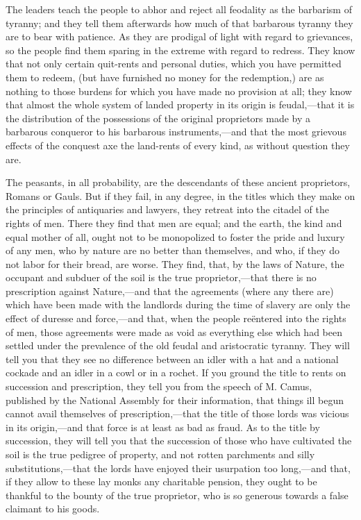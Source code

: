 The leaders teach the people to abhor and reject all feodality as the barbarism of tyranny; and they tell them afterwards how much of that barbarous tyranny they are to bear with patience. As they are prodigal of light with regard to grievances, so the people find them sparing in the extreme with regard to redress. They know that not only certain quit-rents and personal duties, which you have permitted them to redeem, (but have furnished no money for the redemption,) are as nothing to those burdens for which you have made no provision at all; they know that almost the whole system of landed property in its origin is feudal,—that it is the distribution of the possessions of the original proprietors made by a barbarous conqueror to his barbarous instruments,—and that the most grievous effects of the conquest axe the land-rents of every kind, as without question they are.

The peasants, in all probability, are the descendants of these ancient proprietors, Romans or Gauls. But if they fail, in any degree, in the titles which they make on the principles of antiquaries and lawyers, they retreat into the citadel of the rights of men. There they find that men are equal; and the earth, the kind and equal mother of all, ought not to be monopolized to foster the pride and luxury of any men, who by nature are no better than themselves, and who, if they do not labor for their bread, are worse. They find, that, by the laws of Nature, the occupant and subduer of the soil is the true proprietor,—that there is no prescription against Nature,—and that the agreements (where any there are) which have been made with the landlords during the time of slavery are only the effect of duresse and force,—and that, when the people reëntered into the rights of men, those agreements were made as void as everything else which had been settled under the prevalence of the old feudal and aristocratic tyranny. They will tell you that they see no difference between an idler with a hat and a national cockade and an idler in a cowl or in a rochet. If you ground the title to rents on succession and prescription, they tell you from the speech of M. Camus, published by the National Assembly for their information, that things ill begun cannot avail themselves of prescription,—that the title of those lords was vicious in its origin,—and that force is at least as bad as fraud. As to the title by succession, they will tell you that the succession of those who have cultivated the soil is the true pedigree of property, and not rotten parchments and silly substitutions,—that the lords have enjoyed their usurpation too long,—and that, if they allow to these lay monks any charitable pension, they ought to be thankful to the bounty of the true proprietor, who is so generous towards a false claimant to his goods.

